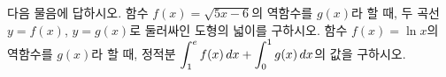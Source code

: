 다음 물음에 답하시오.
 함수 $f(x)=\sqrt{5x-6}$의 역함수를 $g(x)$라 할 때, 두 곡선 $y=f(x)$, $y=g(x)$로 둘러싸인 도형의 넓이를 구하시오.
 함수 $f(x)=\ln x$의 역함수를 $g(x)$라 할 때, 정적분 $\displaystyle\int_{1}^{e} f(x)\mkern3mu dx+\int_{0}^{1} g(x)\mkern3mu dx$의 값을 구하시오.
